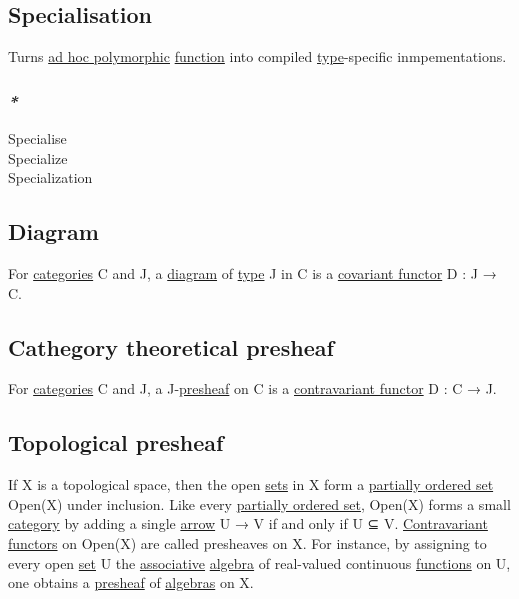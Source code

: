 \documentclass[11pt]{article}
\begin{document}
\subsection{\label{org2a9a8b4}Specialisation}
\label{sec:orgc247d7b}
Turns \hyperref[orgbb95e9a]{ad hoc polymorphic} \hyperref[orge15bc14]{function} into compiled \hyperref[orgc4aea2f]{type}-specific inmpementations.\\

\subsubsection{\emph{*}}
\label{sec:orga77d556}

\label{org2d563bf}Specialise\\
\label{orgb3f989f}Specialize\\
\label{orgbe47cdb}Specialization\\

\subsection{\label{orgaf81fd5}Diagram}
\label{sec:org1221764}

For \hyperref[org2f49b91]{categories} C and J, a \hyperref[orgaf81fd5]{diagram} of \hyperref[orgc4aea2f]{type} J in C is a \hyperref[orgf6f99b5]{covariant functor} D : J → C.\\

\subsection{Cathegory theoretical \label{orgb8c0f80}presheaf}
\label{sec:org49baad4}

For \hyperref[org2f49b91]{categories} C and J, a J-\hyperref[orgb8c0f80]{presheaf} on C is a \hyperref[orge5e36a5]{contravariant functor} D : C → J.\\

\subsection{Topological \label{orgcc48318}presheaf}
\label{sec:org0b33457}

If X is a topological space, then the open \hyperref[org58ec608]{sets} in X form a \hyperref[org393daf8]{partially ordered set} Open(X) under inclusion. Like every \hyperref[org393daf8]{partially ordered set}, Open(X) forms a small \hyperref[org0450535]{category} by adding a single \hyperref[org03967f4]{arrow} U → V if and only if U ⊆ V. \hyperref[orge1bb5ad]{Contravariant} \hyperref[orgdd21ed6]{functors} on Open(X) are called presheaves on X. For instance, by assigning to every open \hyperref[org1faf06d]{set} U the \hyperref[orgbef8a27]{associative} \hyperref[orgecfec51]{algebra} of real-valued continuous \hyperref[orgaa8fb87]{functions} on U, one obtains a \hyperref[orgb8c0f80]{presheaf} of \hyperref[org908535d]{algebras} on X.\\
\end{document}
